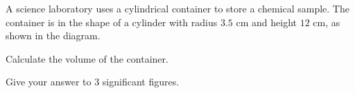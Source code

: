 \begin{question}
\noindent A science laboratory uses a cylindrical container to store a chemical sample. The container is in the shape of a cylinder with radius $3.5$ cm and height $12$ cm, as shown in the diagram.

\begin{center}
\end{center}

\noindent Calculate the volume of the container.

\noindent Give your answer to 3 significant figures.
\vspace{4.5cm}
\begin{flushright}
\end{flushright}
\end{question}
